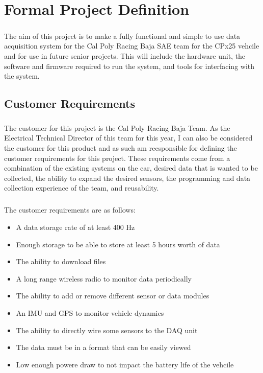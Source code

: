 \chapter{Formal Project Definition}

\paragraph{}
The aim of this project is to make a fully functional and simple to use data acquisition system for the Cal Poly Racing Baja SAE team for the CPx25 vehcile and for use in future senior projects.
This will include the hardware unit, the software and firmware required to run the system, and tools for interfacing with the system.

\section{Customer Requirements}

\paragraph{}
The customer for this project is the Cal Poly Racing Baja Team.
As the Electrical Technical Director of this team for this year, I can also be considered the customer for this product and as such am reesponsible for defining the customer requirements for this project.
These requirements come from a combination of the existing systems on the car, desired data that is wanted to be collected, the ability to expand the desired sensors, the programming and data collection experience of the team, and reusability.

\paragraph{}
The customer requirements are as follows:
\begin{itemize}
	\item A data storage rate of at least 400 Hz
	\item Enough storage to be able to store at least 5 hours worth of data
	\item The ability to download files
	\item A long range wireless radio to monitor data periodically
	\item The ability to add or remove different sensor or data modules
	\item An IMU and GPS to monitor vehicle dynamics
	\item The ability to directly wire some sensors to the DAQ unit
	\item The data must be in a format that can be easily viewed
	\item Low enough powere draw to not impact the battery life of the vehcile
\end{itemize}

